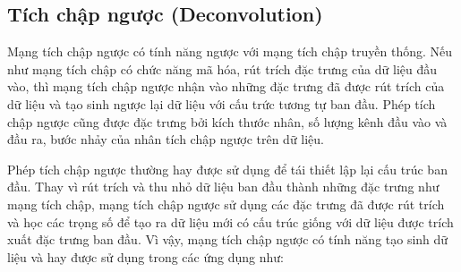 


\subsection{Tích chập ngược (Deconvolution) \cite{deconv}}

Mạng tích chập ngược có tính năng ngược với mạng tích chập truyền thống. Nếu như mạng tích chập có chức năng mã hóa, rút trích đặc trưng của dữ liệu đầu vào, thì mạng tích chập ngược nhận vào những đặc trưng đã được rút trích của dữ liệu và tạo sinh ngược lại dữ liệu với cấu trức tương tự ban đầu. Phép tích chập ngược cũng được đặc trưng bởi kích thước nhân, số lượng kênh đầu vào và đầu ra, bước nhảy của nhân tích chập ngược trên dữ liệu.

Phép tích chập ngược thường hay được sử dụng để tái thiết lập lại cấu trúc ban đầu. Thay vì rút trích và thu nhỏ dữ liệu ban đầu thành những đặc trưng như mạng tích chập, mạng tích chập ngược sử dụng các đặc trưng đã được rút trích và học các trọng số để tạo ra dữ liệu mới có cấu trúc giống với dữ liệu được trích xuất đặc trưng ban đầu. Vì vậy, mạng tích chập ngược có tính năng tạo sinh dữ liệu và hay được sử dụng trong các ứng dụng như:

